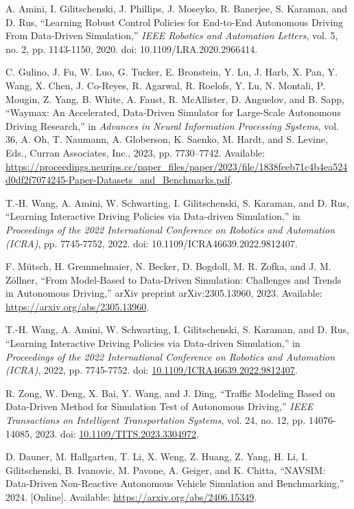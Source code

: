 \documentclass[lettersize,journal]{IEEEtran}
\begin{document}
\begin{thebibliography}{1}
A. Amini, I. Gilitschenski, J. Phillips, J. Moseyko, R. Banerjee, S. Karaman, and D. Rus, ``Learning Robust Control Policies for End-to-End Autonomous Driving From Data-Driven Simulation,'' \textit{IEEE Robotics and Automation Letters}, vol. 5, no. 2, pp. 1143-1150, 2020. doi: 10.1109/LRA.2020.2966414.

C. Gulino, J. Fu, W. Luo, G. Tucker, E. Bronstein, Y. Lu, J. Harb, X. Pan, Y. Wang, X. Chen, J. Co-Reyes, R. Agarwal, R. Roelofs, Y. Lu, N. Montali, P. Mougin, Z. Yang, B. White, A. Faust, R. McAllister, D. Anguelov, and B. Sapp, ``Waymax: An Accelerated, Data-Driven Simulator for Large-Scale Autonomous Driving Research,'' in \textit{Advances in Neural Information Processing Systems}, vol. 36, A. Oh, T. Naumann, A. Globerson, K. Saenko, M. Hardt, and S. Levine, Eds., Curran Associates, Inc., 2023, pp. 7730--7742. Available: \url{https://proceedings.neurips.cc/paper_files/paper/2023/file/1838feeb71c4b4ea524d0df2f7074245-Paper-Datasets_and_Benchmarks.pdf}.

T.-H. Wang, A. Amini, W. Schwarting, I. Gilitschenski, S. Karaman, and D. Rus, ``Learning Interactive Driving Policies via Data-driven Simulation,'' in \textit{Proceedings of the 2022 International Conference on Robotics and Automation (ICRA)}, pp. 7745-7752, 2022. doi: 10.1109/ICRA46639.2022.9812407.

F. Mütsch, H. Gremmelmaier, N. Becker, D. Bogdoll, M. R. Zofka, and J. M. Zöllner, ``From Model-Based to Data-Driven Simulation: Challenges and Trends in Autonomous Driving,'' arXiv preprint arXiv:2305.13960, 2023. Available: \url{https://arxiv.org/abs/2305.13960}.

T.-H. Wang, A. Amini, W. Schwarting, I. Gilitschenski, S. Karaman, and D. Rus, ``Learning Interactive Driving Policies via Data-driven Simulation,'' in \textit{Proceedings of the 2022 International Conference on Robotics and Automation (ICRA)}, 2022, pp. 7745-7752. doi: \url{10.1109/ICRA46639.2022.9812407}.

R. Zong, W. Deng, X. Bai, Y. Wang, and J. Ding, ``Traffic Modeling Based on Data-Driven Method for Simulation Test of Autonomous Driving,'' \textit{IEEE Transactions on Intelligent Transportation Systems}, vol. 24, no. 12, pp. 14076-14085, 2023. doi: \url{10.1109/TITS.2023.3304972}.

D. Dauner, M. Hallgarten, T. Li, X. Weng, Z. Huang, Z. Yang, H. Li, I. Gilitschenski, B. Ivanovic, M. Pavone, A. Geiger, and K. Chitta, ``NAVSIM: Data-Driven Non-Reactive Autonomous Vehicle Simulation and Benchmarking,'' 2024. [Online]. Available: \url{https://arxiv.org/abs/2406.15349}.


\end{thebibliography}
\end{document}
